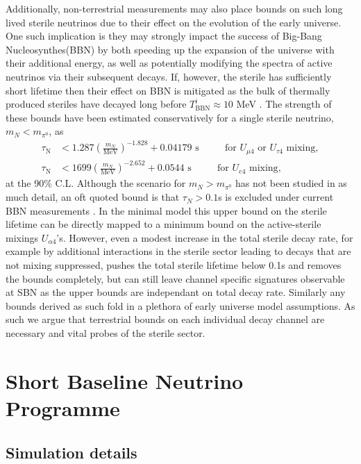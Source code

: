 \documentclass[11pt, a4paper]{article}
\begin{document}
Additionally, non-terrestrial measurements may also place bounds on such long
lived sterile neutrinos due to their effect on the evolution of the early
universe. One such implication is they may strongly impact the success of
Big-Bang Nucleosynthes(BBN) by both speeding up the expansion of the universe
with their additional energy, as well as potentially modifying the spectra of
active neutrinos via their subsequent decays. If, however, the sterile has
sufficiently short lifetime  then their effect on BBN is mitigated as the bulk
of thermally produced steriles have decayed long before $T^i_\text{BBN} \approx
10$ MeV \cite{Fields:2006ga}. The strength of these bounds have been estimated
conservatively for a single sterile neutrino, $m_N < m_{\pi^0}$, as
\cite{Dolgov:2000jw,Dolgov:2000pj}
%
\begin{align*}
	\tau_\text{N} &< 1.287 \left( \frac{m_N}{\text{MeV}}\right)^{-1.828}+0.04179 \text{  s    $\qquad$  for $U_{\mu 4}$ or $U_{\tau 4}$ mixing},\\
	\tau_\text{N} &< 1699 \left( \frac{m_N}{\text{MeV}}\right)^{-2.652}+0.0544 \text{  s    $\qquad$  for $U_{e 4}$ mixing},
\end{align*}
%
at the 90\% C.L. Although the scenario for $m_N > m_{\pi^0}$ has not been
studied in as much detail, an oft quoted bound is that $\tau_N > 0.1$s is
excluded under current BBN measurements \cite{Dolgov:2000j}. In the minimal
model this upper bound on the sterile lifetime can be directly mapped to a
minimum bound on the active-sterile mixings $U_{\alpha 4}$'s. However, even a
modest increase in the total sterile decay rate, for example by additional
interactions in the sterile sector leading to decays that are not mixing
suppressed, pushes the total sterile lifetime below 0.1s and removes the bounds
completely, but can still leave channel specific signatures observable at SBN
as the upper bounds are independant on total decay rate. Similarly any bounds
derived as such fold in a plethora of early universe model assumptions. As such
we argue that terrestrial bounds on each individual decay channel are necessary
and vital probes of the sterile sector. \\

\section{\label{sec:simulation}Short Baseline Neutrino Programme}

\subsection{Simulation details}
\end{document}
